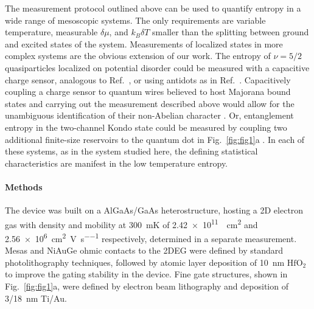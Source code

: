 \documentclass[twocolumn,showpacs,amsmath,amssymb,prl,aps,superscriptaddress]{revtex4-1}
\begin{document}
The measurement protocol outlined above can be used to quantify entropy in a wide range of mesoscopic systems. The only requirements are variable temperature, measurable $\delta \mu$, and $k_B \delta T$  smaller than the splitting between ground and excited states of the system. Measurements of localized states in more complex systems are the obvious extension of our work. The entropy of $\nu=5/2$ quasiparticles localized on potential disorder could be measured with a capacitive charge sensor, analogous to Ref.~, or using antidots as in Ref.~. Capacitively coupling a charge sensor to quantum wires believed to host Majorana bound states and carrying out the measurement described above would allow for the unambiguous identification of their non-Abelian character \cite{Suominen2017, Nichele2017, CITEOTHERS}.  Or, entanglement entropy in the two-channel Kondo state could be measured by coupling two additional finite-size reservoirs to the quantum dot in Fig.~\ref{fig:fig1}a \cite{Potok2007}.  In each of these systems, as in the system studied here, the defining statistical characteristics are manifest in the low temperature entropy.

\paragraph*{Methods} The device was built on a AlGaAs/GaAs heterostructure, hosting a 2D electron gas with density and mobility at \SI{300}{\milli\kelvin} of \SI{2.42e11}{\per\square\centi\metre} and \SI[per-mode=symbol]{2.56e6}{\square\centi\metre\per\volt\per\second} respectively, determined in a separate measurement.   Mesas and NiAuGe ohmic contacts to the 2DEG were defined by standard photolithography techniques, followed by atomic layer deposition of \SI{10}{\nano\metre} $\mathrm{HfO_2}$ to improve the gating stability in the device. Fine gate structures, shown in Fig.~\ref{fig:fig1}a, were defined by electron beam lithography and deposition of \SI{3/18}{\nano\metre} Ti/Au. 
\end{document}

